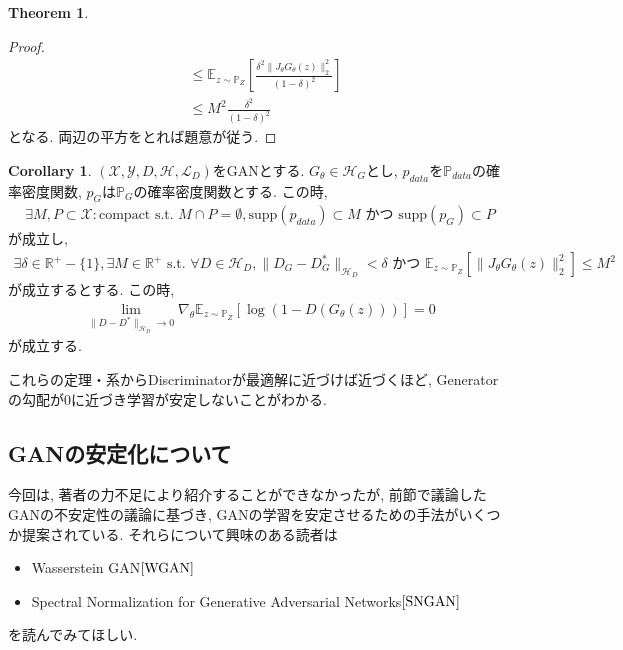 \documentclass[11pt, a4paper, dvipdfmx]{jsarticle}
\theoremstyle{definition}
\newtheorem{Theorem+}[Axiom+]{Theorem}
\newtheorem{Corollary+}[Axiom+]{Corollary}
\newcommand{\R}{\mathbb{R}}
\newcommand{\X}{\mathcal{X}}
\newcommand{\Y}{\mathcal{Y}}
\newcommand{\Hil}{\mathcal{H}}
\newcommand{\Loss}{\mathcal{L}_{D}}
\newcommand{\MLsp}{(\X, \Y, D, \Hil, \Loss)}
\begin{document}
\begin{Theorem+}
\begin{proof}
\begin{align*}
                                                                                                    &\leq\mathbb{E}_{z\sim\mathbb{P}_{Z}}\left[ \frac{\delta^{2}\|J_{\theta}G_{\theta}(z)\|_{2}^{2}}{(1 - \delta)^{2}} \right]\\
                                                                                                    &\leq M^{2}\frac{\delta^{2}}{(1 - \delta)^{2}}
        \end{align*}
        となる. 両辺の平方をとれば題意が従う. 
    \end{proof}
\end{Theorem+}
\begin{Corollary+}
    $\MLsp$をGANとする. $G_{\theta}\in\Hil_{G}$とし, $p_{data}$を$\mathbb{P}_{data}$の確率密度関数, $p_{G}$は$\mathbb{P}_{G}$の確率密度関数とする. この時, 
    \begin{align*}
        \exists M, P\subset\X:\text{compact s.t. }M\cap P = \emptyset, \text{supp}(p_{data})\subset M\text{ かつ }\text{supp}(p_{G})\subset P
    \end{align*}
    が成立し, 
    \begin{align*}
        \exists\delta\in\R^{+}-\{1\}, \exists M\in\R^{+}\text{ s.t. }\forall D\in\Hil_{D}, \|D_{G} - D_{G}^{*}\|_{\Hil_{D}} <\delta\text{ かつ }\mathbb{E}_{z\sim\mathbb{P}_{Z}}[\|J_{\theta}G_{\theta}(z)\|_{2}^{2}] \leq M^{2}
    \end{align*}
    が成立するとする. この時, 
    \begin{align*}
        \lim_{\|D - D^{*}\|_{\Hil_{D}}\to0}\nabla_{\theta}\mathbb{E}_{z\sim\mathbb{P}_{Z}}[\log(1 - D(G_{\theta}(z)))] = 0
    \end{align*}
    が成立する. 
\end{Corollary+}
これらの定理・系からDiscriminatorが最適解に近づけば近づくほど, Generatorの勾配が0に近づき学習が安定しないことがわかる.
\subsection{GANの安定化について}
今回は, 著者の力不足により紹介することができなかったが, 前節で議論したGANの不安定性の議論に基づき, 
GANの学習を安定させるための手法がいくつか提案されている. それらについて興味のある読者は
\begin{itemize}
    \item Wasserstein GAN$\cite{WGAN}$
    \item Spectral Normalization for Generative Adversarial Networks$\cite{SNGAN}$
\end{itemize}
を読んでみてほしい. 
\end{document}
